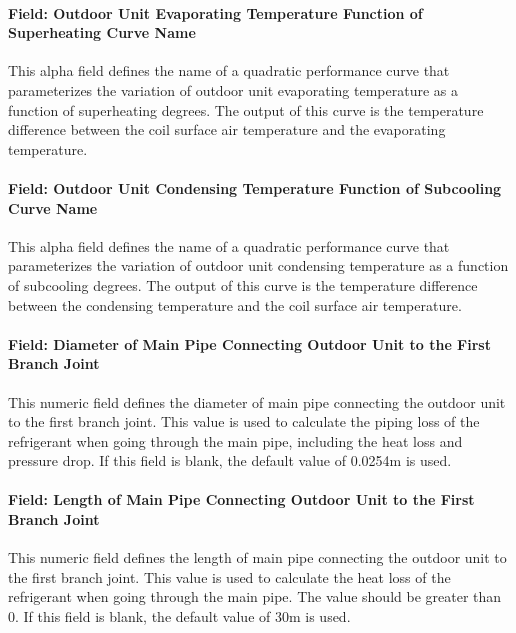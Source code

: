 \paragraph{Field: Outdoor Unit Evaporating Temperature Function of Superheating Curve Name}\label{field-outdoor-unit-evaporating-temperature-function-of-superheating-curve-name}

This alpha field defines the name of a quadratic performance curve that parameterizes the variation of outdoor unit evaporating temperature as a function of superheating degrees. The output of this curve is the temperature difference between the coil surface air temperature and the evaporating temperature.

\paragraph{Field: Outdoor Unit Condensing Temperature Function of Subcooling Curve Name}\label{field-outdoor-unit-condensing-temperature-function-of-subcooling-curve-name}

This alpha field defines the name of a quadratic performance curve that parameterizes the variation of outdoor unit condensing temperature as a function of subcooling degrees. The output of this curve is the temperature difference between the condensing temperature and the coil surface air temperature.

\paragraph{Field: Diameter of Main Pipe Connecting Outdoor Unit to the First Branch Joint}\label{field-diameter-of-main-pipe-connecting-outdoor-unit-to-indoor-units}

This numeric field defines the diameter of main pipe connecting the outdoor unit to the first branch joint. This value is used to calculate the piping loss of the refrigerant when going through the main pipe, including the heat loss and pressure drop. If this field is blank, the default value of 0.0254m is used.

\paragraph{Field: Length of Main Pipe Connecting Outdoor Unit to the First Branch Joint}\label{field-length-of-main-pipe-connecting-outdoor-unit-to-indoor-units}

This numeric field defines the length of main pipe connecting the outdoor unit to the first branch joint. This value is used to calculate the heat loss of the refrigerant when going through the main pipe. The value should be greater than 0. If this field is blank, the default value of 30m is used.

